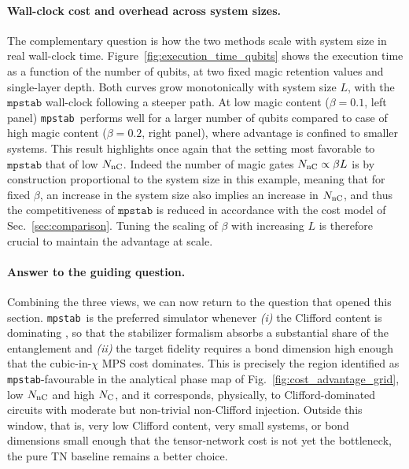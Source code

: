 \documentclass[pra,aps,twocolumn,longbibliography,preprintnumbers,superscriptaddress,nofootnotebib,10pt]{revtex4-2}
\newcommand{\matteo}[1]{{\color{violet} #1}}
\newcommand{\numqubits}{L}  %
\newcommand{\numcliff}{{N_{\rm C}}} %
\newcommand{\nummagic}{{N_{\rm nC}}} %
\newcommand{\mrr}{\beta}    %
\newcommand{\mpstab}{\texttt{mpstab}}
\begin{document}
\paragraph{Wall-clock cost and overhead across system sizes.}
The complementary question is how the two methods scale with system size in 
real wall-clock time. Figure~\ref{fig:execution_time_qubits} shows the execution time as a function of the number of qubits, at two fixed magic retention values and single-layer depth. Both curves grow monotonically with system size $\numqubits$, with the $\mpstab$ wall-clock following a steeper path.
At low magic content ($\mrr=0.1$, left panel) \mpstab\ performs well for a larger number of qubits compared to case of high magic content ($\mrr=0.2$, right panel), where advantage is confined to smaller systems. This result highlights once again that the setting most favorable to $\mpstab$ that of low $\nummagic$. Indeed the number of magic gates $\nummagic \propto \mrr \numqubits$ is by construction proportional to the system size in this example, meaning that for fixed $\beta$, an increase in the system size also implies an increase in $\nummagic$, and thus the competitiveness of $\mpstab$ is reduced in accordance with the cost model of Sec.~\ref{sec:comparison}. Tuning the scaling of $\mrr$ with increasing $L$ is therefore crucial to maintain the advantage at scale.


\paragraph{Answer to the guiding question.}
Combining the three views, we can now return to the question that opened 
this section. \mpstab\ is the preferred simulator whenever \textit{(i)} the 
Clifford content is dominating%
, so that the 
stabilizer formalism absorbs a substantial share of the entanglement and 
\textit{(ii)} the target fidelity requires a bond dimension high enough 
that the cubic-in-$\chi$ MPS cost dominates. This is precisely the region 
identified as \mpstab-favourable in the analytical phase map of 
Fig.~\ref{fig:cost_advantage_grid}, low $\nummagic$ and high $\numcliff$, 
and it corresponds, physically, to Clifford-dominated circuits with 
moderate but non-trivial non-Clifford injection. Outside this window, that 
is, very low Clifford content, very small systems, or bond dimensions small 
enough that the tensor-network cost is not yet the bottleneck, the pure TN 
baseline remains a better choice.
\end{document}
